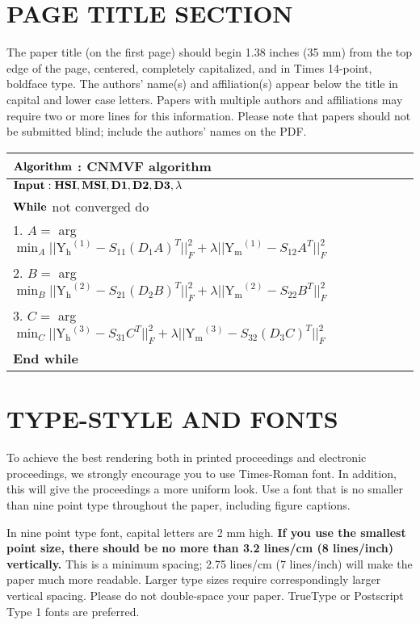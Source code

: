 \documentclass{article}
\begin{document}
\section{PAGE TITLE SECTION}
\label{sec:pagestyle}

The paper title (on the first page) should begin 1.38 inches (35 mm) from the
top edge of the page, centered, completely capitalized, and in Times 14-point,
boldface type.  The authors' name(s) and affiliation(s) appear below the title
in capital and lower case letters.  Papers with multiple authors and
affiliations may require two or more lines for this information. Please note
that papers should not be submitted blind; include the authors' names on the
PDF.

\begin{table}[htbp]
	\centering
	\begin{tabular}{lll}
		\toprule
		$\bf Algorithm $ : CNMVF algorithm  \\
		
		\midrule
		$ \bf Input: HSI,MSI,D1,D2,D3,\lambda $ \\
		$ \bf While $ not converged do\\
		1. $ A =	$ arg $ \min_A || \mathrm{Y_h}^{(1)}-S_{11}(D_1A)^T||_F^2+\lambda||\mathrm{Y_m}^{(1)}-S_{12}A^T||_F^2 $ \\
		
		2. $ B =$ arg $	\min_B || \mathrm{Y_h}^{(2)}-S_{21}(D_2B)^T||_F^2+\lambda||\mathrm{Y_m}^{(2)}-S_{22}B^T||_F^2 $\\
		3. $ C =$ arg $	\min_C || \mathrm{Y_h}^{(3)}-S_{31}C^T||_F^2+\lambda||\mathrm{Y_m}^{(3)}-S_{32}(D_3C)^T||_F^2 $\\
		\bf End while \\
		\bottomrule	
	\end{tabular}
\end{table}


\section{TYPE-STYLE AND FONTS}
\label{sec:typestyle}

To achieve the best rendering both in printed proceedings and electronic proceedings, we
strongly encourage you to use Times-Roman font.  In addition, this will give
the proceedings a more uniform look.  Use a font that is no smaller than nine
point type throughout the paper, including figure captions.

In nine point type font, capital letters are 2 mm high.  {\bf If you use the
smallest point size, there should be no more than 3.2 lines/cm (8 lines/inch)
vertically.}  This is a minimum spacing; 2.75 lines/cm (7 lines/inch) will make
the paper much more readable.  Larger type sizes require correspondingly larger
vertical spacing.  Please do not double-space your paper.  TrueType or
Postscript Type 1 fonts are preferred.
\end{document}
